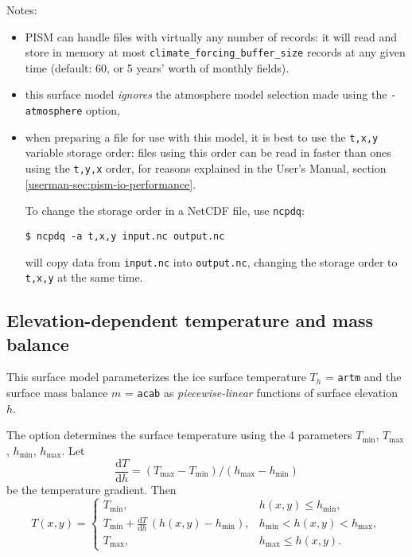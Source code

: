 \documentclass[titlepage,letterpaper,final]{scrartcl}
\begin{document}
\noindent Notes:
\begin{itemize}
\item PISM can handle files with virtually any number of records: it will
  read and store in memory at most \texttt{climate_forcing_buffer_size} records
  at any given time (default: 60, or 5 years' worth of monthly fields).
\item this surface model \emph{ignores} the atmosphere model selection made
  using the \texttt{-atmosphere} option,
\item when preparing a file for use with this model, it is best to use the \texttt{t,x,y} variable storage order: files using this order can be read in faster than ones using the \texttt{t,y,x} order, for reasons explained in the User's Manual, section \ref*{userman-sec:pism-io-performance}.

  To change the storage order in a NetCDF file, use \texttt{ncpdq}:
\begin{verbatim}
$ ncpdq -a t,x,y input.nc output.nc
\end{verbatim}%
  will copy data from \texttt{input.nc} into \texttt{output.nc}, changing the storage order to \texttt{t,x,y} at the same time.
\end{itemize}

\subsection{Elevation-dependent temperature and mass balance}
\label{sec:surface-elev-depend-temp}

\newcommand{\var}[2]{ {#1}_{\text{#2}} }
\newcommand{\h}[1]{ \var{h}{#1} }
\newcommand{\T}[1]{ \var{T}{#1} }
\newcommand{\m}[1]{ \var{m}{#1} }
\newcommand{\ms}[1]{ \var{m^{*}}{#1} }
\newcommand{\diff}[2]{ \frac{\mathrm{d}#1}{\mathrm{d}#2} }

This surface model parameterizes the ice surface temperature $T_{h}$ = \texttt{artm} and the surface mass balance $m$ = \texttt{acab} as \emph{piecewise-linear} functions of surface elevation $h$.

The option  determines the surface temperature using the 4 parameters $\T{min}$, $\T{max}$, $\h{min}$, $\h{max}$. Let
\begin{equation}
  \diff{T}{h} = (\T{max} - \T{min}) / (\h{max} - \h{min})
\end{equation}
be the temperature gradient. Then
\begin{equation}
  T(x,y) =
  \begin{cases}
    \T{min}, & h(x,y) \le \h{min}, \\
    \T{min} + \diff{T}{h} \, (h(x,y) - \h{min}), & \h{min} < h(x,y) < \h{max}, \\
    \T{max}, & \h{max} \le h(x,y).
  \end{cases}
\end{equation}
\end{document}
